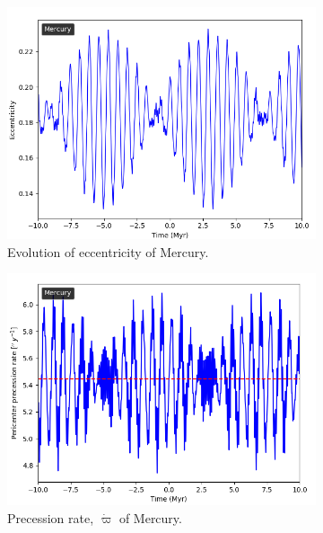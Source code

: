\documentclass[11pt, oneside]{article}   	%
\begin{document}
\begin{figure}[!h]
    \centering
    \begin{subfigure}[t]{0.49\textwidth}
    \captionsetup{width=0.9\textwidth}
	\centering
       	 \includegraphics[width=\textwidth]{Merc_ecc.png}
       	 \caption{Evolution of eccentricity of Mercury.}
        	\label{}
    \end{subfigure}
    \begin{subfigure}[t]{0.49\textwidth}
    \captionsetup{width=0.9\textwidth}
        	\centering
	\includegraphics[width=\textwidth]{Merc_pidot.png}
        	\caption{Precession rate, $\dot{\varpi}$ of Mercury.}
        	\label{fig:pidot}
    \end{subfigure}
    \caption{}
    \label{}
\end{figure}
\end{document}
